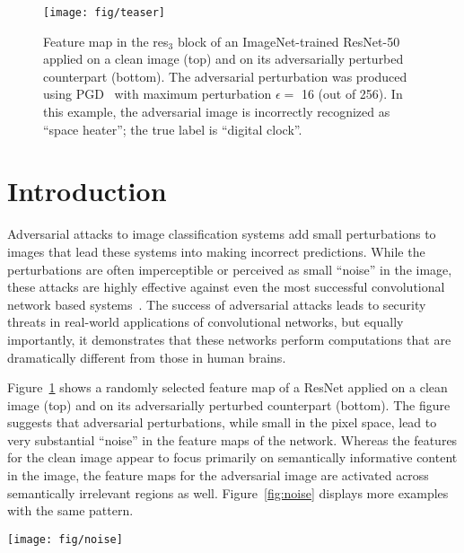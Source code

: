 \documentclass[10pt,twocolumn,letterpaper]{article}
\begin{document}
\begin{figure}[t]
\centering
\texttt{[image: fig/teaser]}
\vspace{-.2em}
\caption{Feature map in the res$_3$ block of an ImageNet-trained ResNet-50 \cite{He2016} applied on a clean image (top) and on its adversarially perturbed counterpart (bottom). The adversarial  perturbation was produced using PGD~\cite{Madry2018} with maximum perturbation $\epsilon\!=\!$ 16 (out of 256). In this example, the adversarial image is incorrectly recognized as ``space heater''; the true label is ``digital clock''.}
\label{fig:teaser}
\vspace{-1.2em}
\end{figure}


\vspace{-0.5em}
\section{Introduction}

Adversarial attacks to image classification systems \cite{Szegedy2014} add small perturbations to images that lead these systems into making incorrect predictions. While the perturbations are often imperceptible or perceived as small ``noise'' in the image, these attacks are highly effective against even the most successful convolutional network based systems~\cite{Krizhevsky2012,LeCun1989}. The success of adversarial attacks leads to security threats in real-world applications of convolutional networks, but equally importantly, it demonstrates that these networks perform computations that are dramatically different from those in human brains.

Figure~\ref{fig:teaser} shows a randomly selected feature map of a ResNet \cite{He2016} applied on a clean image (top) and on its adversarially perturbed counterpart (bottom). The figure suggests that adversarial perturbations, while small in the pixel space, lead to very substantial ``noise'' in the feature maps of the network. Whereas the features for the clean image appear to focus primarily on semantically informative content in the image, the feature maps for the adversarial image are activated across semantically irrelevant regions as well. Figure~\ref{fig:noise} displays more examples with the same pattern.

\begin{figure*}[t]
\centering
\vspace{-.5em}
\texttt{[image: fig/noise]}
\vspace{-1em}
\caption{More examples similar to Figure~\ref{fig:teaser}. We show feature maps corresponding to clean images (top) and to their adversarial perturbed versions (bottom). The feature maps for each pair of examples are from the same channel of a res$_3$ block in the same ResNet-50 trained on clean images. The attacker has a maximum perturbation $\epsilon=16$ in the pixel domain.}
\label{fig:noise}
\vspace{-1.5em}
\end{figure*}
\end{document}
